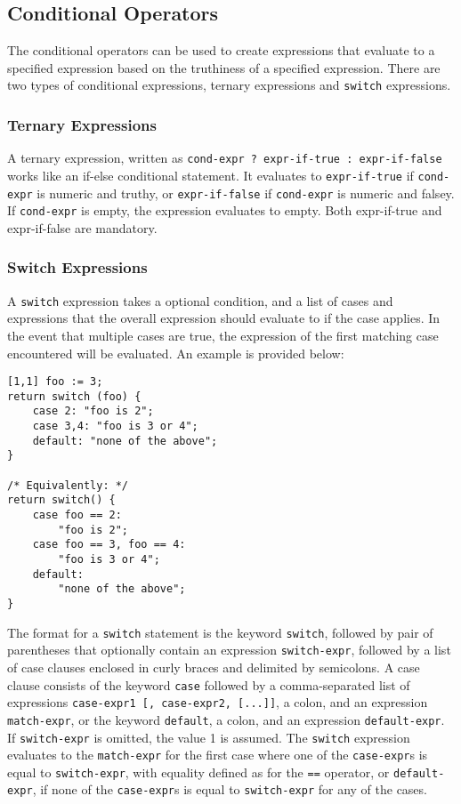 		\subsection{Conditional Operators}
			The conditional operators can be used to create expressions that evaluate to a specified expression based on the truthiness of a specified expression. There are two types of conditional expressions, ternary expressions and \texttt{switch} expressions.
			
\subsubsection{Ternary Expressions}
\label{sec:Ternary}
A ternary expression, written as \texttt{cond-expr ? expr-if-true : expr-if-false} works like an if-else conditional statement. It evaluates to \texttt{expr-if-true} if \texttt{cond-expr} is numeric and truthy, or  \texttt{expr-if-false} if \texttt{cond-expr} is numeric and falsey. If \texttt{cond-expr} is empty, the expression evaluates to empty. Both expr-if-true and expr-if-false are mandatory.

\subsubsection{Switch Expressions}
\label{sec:Switch}			
A \texttt{switch} expression takes a optional condition, and a list of cases and expressions that the overall expression should evaluate to if the case applies. In the event that multiple cases are true, the expression of the first matching case encountered will be evaluated. An example is provided below:
\begin{lstlisting}
[1,1] foo := 3;
return switch (foo) {
	case 2: "foo is 2";
	case 3,4: "foo is 3 or 4";
	default: "none of the above";
}

/* Equivalently: */
return switch() {
	case foo == 2:
		"foo is 2";
	case foo == 3, foo == 4:
		"foo is 3 or 4";
	default:
		"none of the above";
}
\end{lstlisting}
The format for a \texttt{switch} statement is the keyword \texttt{switch}, followed by pair of parentheses that optionally contain an expression \texttt{switch-expr}, followed by a list of case clauses enclosed in curly braces and delimited by semicolons. A case clause consists of the keyword \texttt{case} followed by a comma-separated list of expressions \texttt{case-expr1 [, case-expr2, [...]]}, a colon, and an expression \texttt{match-expr}, or the keyword \texttt{default}, a colon, and an expression \texttt{default-expr}. If \texttt{switch-expr} is omitted, the value 1 is assumed. The \texttt{switch} expression evaluates to the \texttt{match-expr} for the first case where one of the \texttt{case-expr}s is equal to \texttt{switch-expr}, with equality defined as for the \texttt{==} operator, or \texttt{default-expr}, if none of the \texttt{case-expr}s is equal to \texttt{switch-expr} for any of the cases. 

